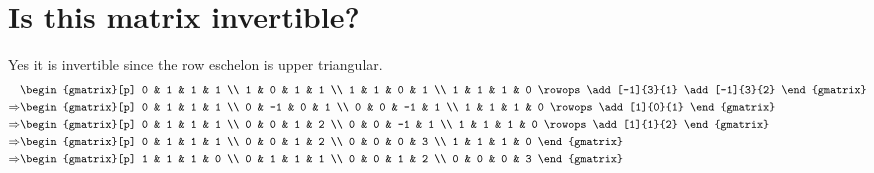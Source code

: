 \section{Is this matrix invertible?}
Yes it is invertible since the row eschelon is upper triangular.
\begin{align*}
    & \begin{gmatrix}[p]
        0 & 1 & 1 & 1 \\
        1 & 0 & 1 & 1 \\
        1 & 1 & 0 & 1 \\
        1 & 1 & 1 & 0
        \rowops
        \add[-1]{3}{1}
        \add[-1]{3}{2}
      \end{gmatrix} \\
     \Rightarrow & \begin{gmatrix}[p]
        0 & 1 & 1 & 1 \\
        0 & -1 & 0 & 1 \\
        0 & 0 & -1 & 1 \\
        1 & 1 & 1 & 0
        \rowops
        \add[1]{0}{1}
      \end{gmatrix} \\
    \Rightarrow & \begin{gmatrix}[p]
        0 & 1 & 1 & 1 \\
        0 & 0 & 1 & 2 \\
        0 & 0 & -1 & 1 \\
        1 & 1 & 1 & 0
        \rowops
        \add[1]{1}{2}
      \end{gmatrix} \\
    \Rightarrow & \begin{gmatrix}[p]
        0 & 1 & 1 & 1 \\
        0 & 0 & 1 & 2 \\
        0 & 0 & 0 & 3 \\
        1 & 1 & 1 & 0
      \end{gmatrix} \\
    \Rightarrow & \begin{gmatrix}[p]
        1 & 1 & 1 & 0 \\
        0 & 1 & 1 & 1 \\
        0 & 0 & 1 & 2 \\
        0 & 0 & 0 & 3        
      \end{gmatrix} \\
\end{align*}